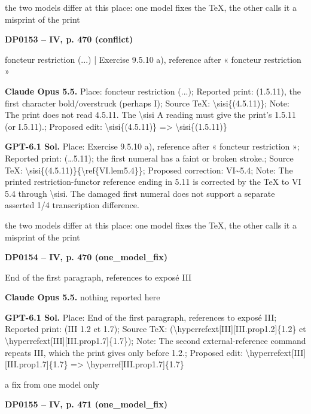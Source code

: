 the two models differ at this place: one model fixes the TeX, the other calls it a misprint of the print\par
\par\noindent\hypertarget{DP0153}{}\textbf{DP0153 -- IV, p. 470 (conflict)}\par
foncteur restriction (...) | Exercise 9.5.10 a), reference after « foncteur restriction »\par
\textbf{Claude Opus 5.5.} Place: foncteur restriction (...); Reported print: (1.5.11), the first character bold/overstruck (perhaps I); Source TeX: \textbackslash{}sisi\{(4.5.11)\}; Note: The print does not read 4.5.11. The \textbackslash{}sisi A reading must give the print's 1.5.11 (or I.5.11).; Proposed edit: \textbackslash{}sisi\{(4.5.11)\} =\allowbreak > \textbackslash{}sisi\{(1.5.11)\}\par
\textbf{GPT-6.1 Sol.} Place: Exercise 9.5.10 a), reference after « foncteur restriction »; Reported print: (…5.11); the first numeral has a faint or broken stroke.; Source TeX: \textbackslash{}sisi\{(4.5.11)\}\{\textbackslash{}ref\{VI.lem5.4\}\}; Proposed correction: VI\textasciitilde{}5.4; Note: The printed restriction-functor reference ending in 5.11 is corrected by the TeX to VI 5.4 through \textbackslash{}sisi. The damaged first numeral does not support a separate asserted 1/4 transcription difference.\par
the two models differ at this place: one model fixes the TeX, the other calls it a misprint of the print\par
\par\noindent\hypertarget{DP0154}{}\textbf{DP0154 -- IV, p. 470 (one\_model\_fix)}\par
End of the first paragraph, references to exposé III\par
\textbf{Claude Opus 5.5.} nothing reported here\par
\textbf{GPT-6.1 Sol.} Place: End of the first paragraph, references to exposé III; Reported print: (III 1.2 et 1.7); Source TeX: (\textbackslash{}hyperrefext[III][III.prop1.2]\{1.2\} et \textbackslash{}hyperrefext[III][III.prop1.7]\{1.7\}); Note: The second external-reference command repeats III, which the print gives only before 1.2.; Proposed edit: \textbackslash{}hyperrefext[III][III.prop1.7]\{1.7\} =\allowbreak > \textbackslash{}hyperref[III.prop1.7]\{1.7\}\par
a fix from one model only\par
\par\noindent\hypertarget{DP0155}{}\textbf{DP0155 -- IV, p. 471 (one\_model\_fix)}\par
